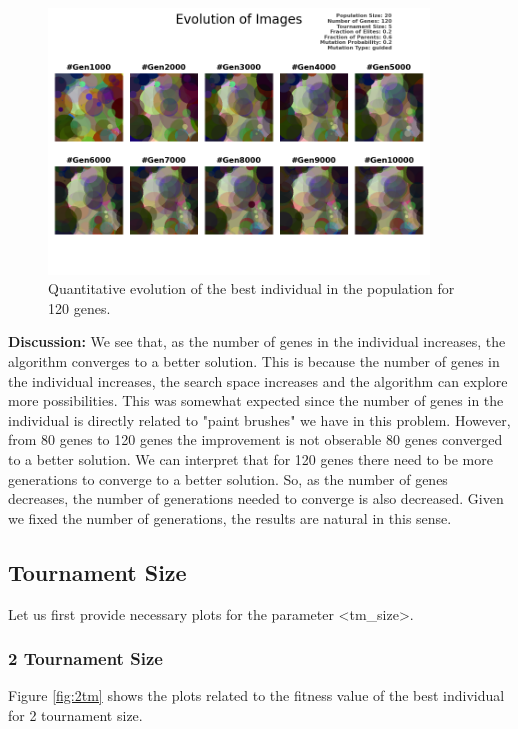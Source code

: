 \documentclass{assignment}
\begin{document}
\begin{figure}[!htb]
    \centering
    \includegraphics[width=0.9\textwidth]{figures/images_output_20_120_5_0.2_0.6_0.2_guided.png}
    \caption{Quantitative evolution of the best individual in the population for 120 genes.}
    \label{fig:120genes_image}
\end{figure}

\textbf{Discussion:} We see that, as the number of genes in the individual increases, the algorithm converges to a better solution. This is because the number of genes in the individual increases, the search space increases and the algorithm can explore more possibilities. This was somewhat expected since the number of genes in the individual is directly related to "paint brushes" we have in this problem. However, from 80 genes to 120 genes the improvement is not obserable 80 genes converged to a better solution. We can interpret that for 120 genes there need to be more generations to converge to a better solution. So, as the number of genes decreases, the number of generations needed to converge is also decreased. Given we fixed the number of generations, the results are natural in this sense.

\subsection{Tournament Size}
Let us first provide necessary plots for the parameter \textless{}tm\_size\textgreater{}.

\subsubsection{2 Tournament Size}
Figure \ref{fig:2tm} shows the plots related to the fitness value of the best individual for 2 tournament size.
\end{document}
